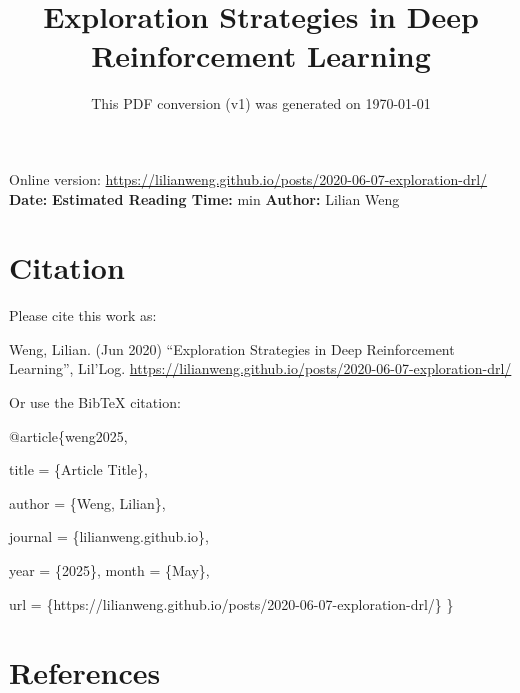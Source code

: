 \documentclass[12pt]{article}
\title{Exploration Strategies in Deep Reinforcement Learning}
\date{This PDF conversion (v1) was generated on \today\footnotemark}
\begin{document}
\maketitle
\begin{center}
    Online version: \url{https://lilianweng.github.io/posts/2020-06-07-exploration-drl/} \\
    \textbf{Date:} \quad
    \textbf{Estimated Reading Time:}  min \quad
    \textbf{Author:} Lilian Weng
\end{center}




\newpage
\tableofcontents
\newpage
\vspace{1em}
\n\n\n\section{Citation}
Please cite this work as:

\begin{tcolorbox}[colback=black!5!white, colframe=black!80!white, boxrule=0.5pt, arc=2mm, left=1mm, right=1mm, top=1mm, bottom=1mm]
  Weng, Lilian. (Jun 2020) ``Exploration Strategies in Deep Reinforcement Learning'', Lil'Log. \url{https://lilianweng.github.io/posts/2020-06-07-exploration-drl/}
  \end{tcolorbox}

Or use the BibTeX citation:

\begin{tcolorbox}[
    colback=black!5!white,
    colframe=black!80!white,
    boxrule=0.5pt,
    arc=2mm,
    left=1mm,
    right=1mm,
    top=1mm,
    bottom=1mm,
    listing only,
    listing options={
      basicstyle=\ttfamily\footnotesize,
      breaklines=true,
      literate={\{}{{\char`\{}}1 {\}}{{\char`\}}}1
    }
  ]
  @article\{weng2025,

    title   = \{Article Title\},

    author  = \{Weng, Lilian\},

    journal = \{lilianweng.github.io\},

    year    = \{2025\},
    month   = \{May\},

    url     = \{https://lilianweng.github.io/posts/2020-06-07-exploration-drl/\}\n
  \}
  \end{tcolorbox}

\newpage
\section{References}

\n
\end{document}

